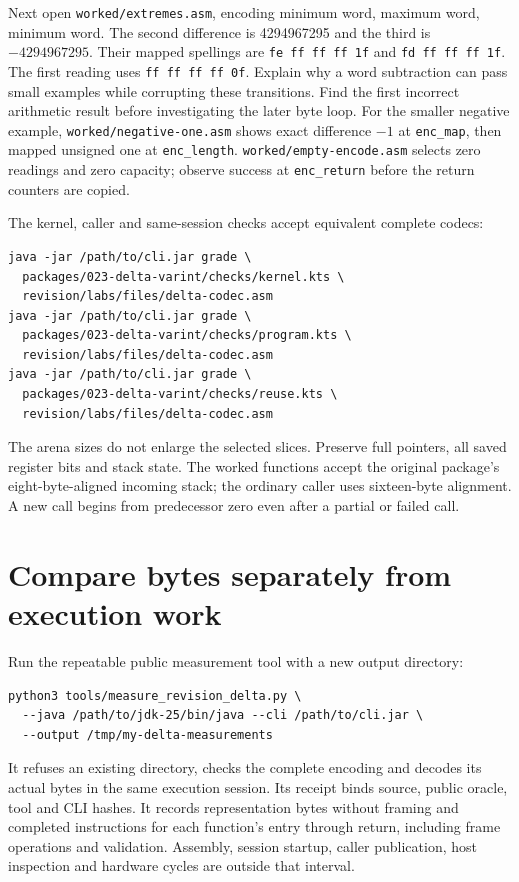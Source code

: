 Next open \texttt{worked/extremes.asm}, encoding minimum word, maximum word,
minimum word. The second
difference is 4294967295 and the third is $-4294967295$. Their mapped spellings
are \texttt{fe ff ff ff 1f} and \texttt{fd ff ff ff 1f}. The first reading
uses \texttt{ff ff ff ff 0f}. Explain why a word subtraction can pass small
examples while corrupting these transitions. Find the first incorrect arithmetic
result before investigating the later byte loop. For the smaller negative
example, \texttt{worked/negative-one.asm} shows exact difference $-1$ at
\texttt{enc\_map}, then mapped unsigned one at \texttt{enc\_length}.
\texttt{worked/empty-encode.asm} selects zero readings and zero capacity;
observe success at \texttt{enc\_return} before the return counters are copied.

The kernel, caller and same-session checks accept equivalent complete codecs:
\begin{verbatim}
java -jar /path/to/cli.jar grade \
  packages/023-delta-varint/checks/kernel.kts \
  revision/labs/files/delta-codec.asm
java -jar /path/to/cli.jar grade \
  packages/023-delta-varint/checks/program.kts \
  revision/labs/files/delta-codec.asm
java -jar /path/to/cli.jar grade \
  packages/023-delta-varint/checks/reuse.kts \
  revision/labs/files/delta-codec.asm
\end{verbatim}
The arena sizes do not enlarge the selected slices. Preserve full pointers,
all saved register bits and stack state. The worked functions accept the
original package's eight-byte-aligned incoming stack; the ordinary caller uses
sixteen-byte alignment. A new call begins from predecessor zero even after a
partial or failed call.

\Needspace{10\baselineskip}
\section{Compare bytes separately from execution work}

Run the repeatable public measurement tool with a new output directory:
\begin{verbatim}
python3 tools/measure_revision_delta.py \
  --java /path/to/jdk-25/bin/java --cli /path/to/cli.jar \
  --output /tmp/my-delta-measurements
\end{verbatim}
It refuses an existing directory, checks the complete encoding and decodes its
actual bytes in the same execution session. Its receipt binds source, public
oracle, tool and CLI hashes. It records representation bytes without framing
and completed instructions for each function's entry through return, including
frame operations and validation. Assembly, session startup, caller publication,
host inspection and hardware cycles are outside that interval.


